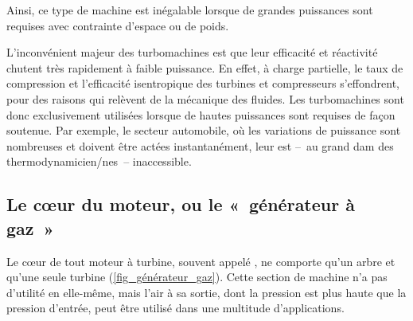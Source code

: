 		Ainsi, ce type de machine est inégalable lorsque de grandes puissances sont requises avec contrainte d’espace ou de poids.

		L’inconvénient majeur des turbomachines est que leur efficacité et réactivité chutent très rapidement à faible puissance. En effet, à charge partielle, le taux de compression et l’efficacité isentropique des turbines et compresseurs s’effondrent, pour des raisons qui relèvent de la mécanique des fluides. Les turbomachines sont donc exclusivement utilisées lorsque de hautes puissances sont requises de façon soutenue. Par exemple, le secteur automobile, où les variations de puissance sont nombreuses et doivent être actées instantanément, leur est --\ au grand dam des thermodynamicien/nes\ -- inaccessible.


	\subsection{Le cœur du moteur, ou le «~générateur à gaz~»}
	\label{ch_generateur_gaz}

		Le cœur de tout moteur à turbine, souvent appelé , ne comporte qu’un arbre et qu’une seule turbine (\cref{fig_générateur_gaz}). Cette section de machine n’a pas d’utilité en elle-même, mais l’air à sa sortie, dont la pression est plus haute que la pression d’entrée, peut être utilisé dans une multitude d’applications.

